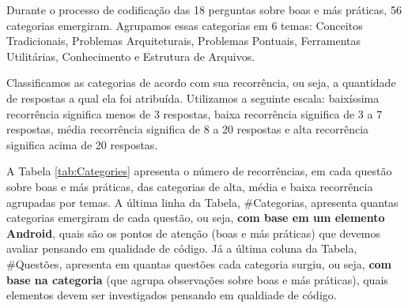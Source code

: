 Durante o processo de codifica\c{c}\~ao das 18 perguntas sobre boas e m\'as pr\'aticas, 56 categorias emergiram. Agrupamos essas categorias em 6 temas: Conceitos Tradicionais, Problemas Arquiteturais, Problemas Pontuais, Ferramentas Utilit\'arias, Conhecimento e Estrutura de Arquivos. 

Classificamos as categorias de acordo com sua recorr\^encia, ou seja, a quantidade de respostas a qual ela foi atribu\'ida. Utilizamos a seguinte escala: baix\'issima recorr\^encia significa menos de 3 respostas, baixa recorr\^encia significa de 3 a 7 respostas, m\'edia recorr\^encia significa de 8 a 20 respostas e alta recorr\^encia significa acima de 20 respostas.

A Tabela \ref{tab:Categories} apresenta o n\'umero de recorr\^encias, em cada quest\~ao sobre boas e m\'as pr\'aticas, das categorias de alta, m\'edia e baixa recorr\^encia agrupadas por temas. A \'ultima linha da Tabela, \#Categorias, apresenta quantas categorias emergiram de cada quest\~ao, ou seja, \textbf{com base em um elemento Android}, quais s\~ao os pontos de aten\c{c}\~ao (boas e m\'as pr\'aticas) que devemos avaliar pensando em qualidade de c\'odigo. J\'a a \'ultima coluna da Tabela, \#Quest\~oes, apresenta em quantas quest\~oes cada categoria surgiu, ou seja, \textbf{com base na categoria} (que agrupa observa\c{c}\~oes sobre boas e m\'as pr\'aticas), quais elementos devem ser investigados pensando em qualdiade de c\'odigo. 



